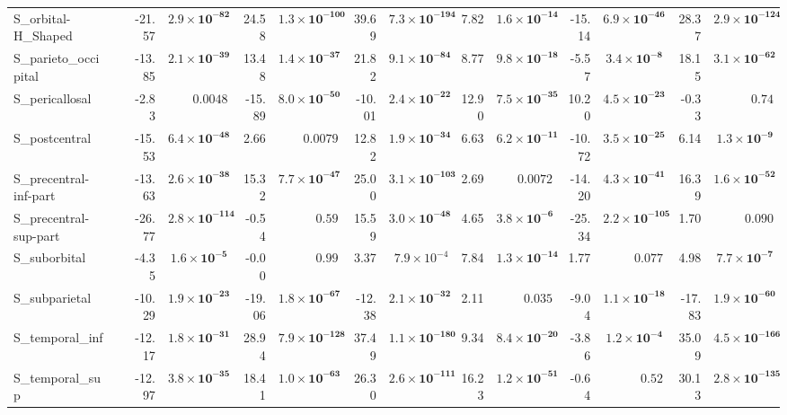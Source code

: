 {\begin{longtable}{llrrrrrrrrrrrr}
S\_orbital-H\_Shaped &  & -21.57 & $\mathbf{2.9{\times}10^{-82}}$ & 24.58 & $\mathbf{1.3{\times}10^{-100}}$ & 39.69 & $\mathbf{7.3{\times}10^{-194}}$ & 7.82 & $\mathbf{1.6{\times}10^{-14}}$ & -15.14 & $\mathbf{6.9{\times}10^{-46}}$ & 28.37 & $\mathbf{2.9{\times}10^{-124}}$ \\
S\_parieto\_occipital &  & -13.85 & $\mathbf{2.1{\times}10^{-39}}$ & 13.48 & $\mathbf{1.4{\times}10^{-37}}$ & 21.82 & $\mathbf{9.1{\times}10^{-84}}$ & 8.77 & $\mathbf{9.8{\times}10^{-18}}$ & -5.57 & $\mathbf{3.4{\times}10^{-8}}$ & 18.15 & $\mathbf{3.1{\times}10^{-62}}$ \\
S\_pericallosal &  & -2.83 & $0.0048$ & -15.89 & $\mathbf{8.0{\times}10^{-50}}$ & -10.01 & $\mathbf{2.4{\times}10^{-22}}$ & 12.90 & $\mathbf{7.5{\times}10^{-35}}$ & 10.20 & $\mathbf{4.5{\times}10^{-23}}$ & -0.33 & $0.74$ \\
S\_postcentral &  & -15.53 & $\mathbf{6.4{\times}10^{-48}}$ & 2.66 & $0.0079$ & 12.82 & $\mathbf{1.9{\times}10^{-34}}$ & 6.63 & $\mathbf{6.2{\times}10^{-11}}$ & -10.72 & $\mathbf{3.5{\times}10^{-25}}$ & 6.14 & $\mathbf{1.3{\times}10^{-9}}$ \\
S\_precentral-inf-part &  & -13.63 & $\mathbf{2.6{\times}10^{-38}}$ & 15.32 & $\mathbf{7.7{\times}10^{-47}}$ & 25.00 & $\mathbf{3.1{\times}10^{-103}}$ & 2.69 & $0.0072$ & -14.20 & $\mathbf{4.3{\times}10^{-41}}$ & 16.39 & $\mathbf{1.6{\times}10^{-52}}$ \\
S\_precentral-sup-part &  & -26.77 & $\mathbf{2.8{\times}10^{-114}}$ & -0.54 & $0.59$ & 15.59 & $\mathbf{3.0{\times}10^{-48}}$ & 4.65 & $\mathbf{3.8{\times}10^{-6}}$ & -25.34 & $\mathbf{2.2{\times}10^{-105}}$ & 1.70 & $0.090$ \\
S\_suborbital &  & -4.35 & $\mathbf{1.6{\times}10^{-5}}$ & -0.00 & $0.99$ & 3.37 & $7.9{\times}10^{-4}$ & 7.84 & $\mathbf{1.3{\times}10^{-14}}$ & 1.77 & $0.077$ & 4.98 & $\mathbf{7.7{\times}10^{-7}}$ \\
S\_subparietal &  & -10.29 & $\mathbf{1.9{\times}10^{-23}}$ & -19.06 & $\mathbf{1.8{\times}10^{-67}}$ & -12.38 & $\mathbf{2.1{\times}10^{-32}}$ & 2.11 & $0.035$ & -9.04 & $\mathbf{1.1{\times}10^{-18}}$ & -17.83 & $\mathbf{1.9{\times}10^{-60}}$ \\
S\_temporal\_inf &  & -12.17 & $\mathbf{1.8{\times}10^{-31}}$ & 28.94 & $\mathbf{7.9{\times}10^{-128}}$ & 37.49 & $\mathbf{1.1{\times}10^{-180}}$ & 9.34 & $\mathbf{8.4{\times}10^{-20}}$ & -3.86 & $\mathbf{1.2{\times}10^{-4}}$ & 35.09 & $\mathbf{4.5{\times}10^{-166}}$ \\
S\_temporal\_sup &  & -12.97 & $\mathbf{3.8{\times}10^{-35}}$ & 18.41 & $\mathbf{1.0{\times}10^{-63}}$ & 26.30 & $\mathbf{2.6{\times}10^{-111}}$ & 16.23 & $\mathbf{1.2{\times}10^{-51}}$ & -0.64 & $0.52$ & 30.13 & $\mathbf{2.8{\times}10^{-135}}$ \\

\end{longtable}}
